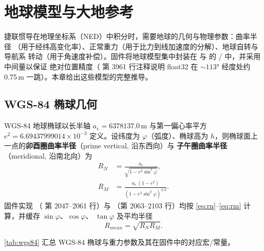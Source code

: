 \section{地球模型与大地参考}

捷联惯导在地理坐标系（NED）中积分时，需要地球的几何与物理参数：曲率半径
（用于经纬高变化率）、正常重力（用于比力到线加速度的分解）、地球自转与导航系
转动（用于角速度补偿）。固件将地球模型集中封装在  与
 的  /
 中，并采用  中间量以保证
绝对位置精度（ 第 3961 行注释说明 float32 在
$\sim113°$ 经度处约 0.75\,m 一跳）。本章给出这些模型的完整推导。

\subsection{WGS-84 椭球几何}

WGS-84 地球椭球以长半轴 $a_e = 6378137.0$\,m 与第一偏心率平方
$e^2 = 6.69437999014\times10^{-3}$ 定义。设纬度为 $\varphi$（弧度）、椭球高为
$h$，则椭球面上一点的\textbf{卯酉圈曲率半径}（prime vertical, 沿东西向）与
\textbf{子午圈曲率半径}（meridional, 沿南北向）为
\begin{align}
  R_N &= \frac{a_e}{\sqrt{1 - e^2\sin^2\varphi}},
  \label{eq:rn} \\
  R_M &= \frac{a_e\,(1 - e^2)}
    {\left(1 - e^2\sin^2\varphi\right)^{3/2}}.
  \label{eq:rm}
\end{align}
固件实现 （ 第
2047--2061 行）与 （第 2063--2103 行）均按
\cref{eq:rn}--\cref{eq:rm} 计算，并缓存 $\sin\varphi$、$\cos\varphi$、
$\tan\varphi$ 及平均半径
\begin{equation}
  R_{mean} = \sqrt{R_N R_M}.
  \label{eq:mean-radius}
\end{equation}

\cref{tab:wgs84} 汇总 WGS-84 椭球与重力参数及其在固件中的对应宏/常量。

